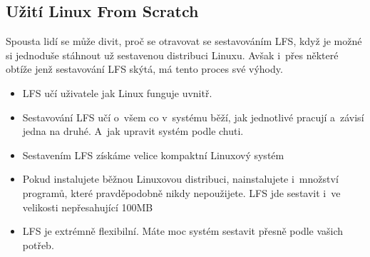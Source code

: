 \documentclass[a4paper,12pt]{article}
\begin{document}
\subsection{Užití Linux From Scratch}
Spousta lidí se může divit, proč se otravovat se sestavováním LFS, když je možné si jednoduše stáhnout už sestavenou distribuci Linuxu. Avšak i~přes některé obtíže jenž sestavování LFS skýtá, má tento proces své výhody.~\cite{LFS}


\begin{itemize}
 \item LFS učí uživatele jak Linux funguje uvnitř.


 \item Sestavování LFS učí o~všem co v~systému běží, jak jednotlivé pracují a~závisí jedna na druhé. A~jak upravit systém podle chuti.


 \item Sestavením LFS získáme velice kompaktní Linuxový systém


 \item Pokud instalujete běžnou Linuxovou distribuci, nainstalujete i~množství programů, které pravděpodobně nikdy nepoužijete. LFS jde sestavit i~ve velikosti nepřesahující 100MB


\item LFS je extrémně flexibilní. Máte moc systém sestavit přesně podle vašich potřeb.


\end{itemize}
\end{document}
